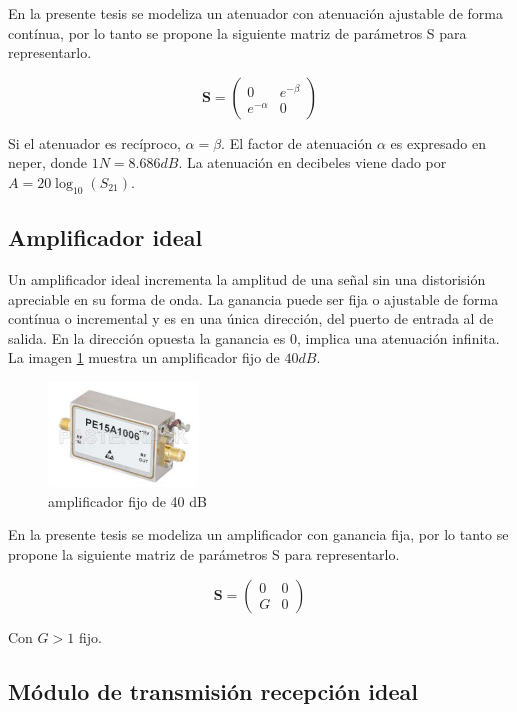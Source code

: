 En la presente tesis se modeliza un atenuador con atenuación ajustable de forma contínua, por lo tanto se propone la siguiente
matriz de parámetros S para representarlo.

$$
\mathbf{S} = \begin{pmatrix} 0 & e^{-\beta}\\e^{-\alpha} & 0\end{pmatrix}
$$

Si el atenuador es recíproco, $\alpha = \beta$. El factor de atenuación $\alpha$ es expresado en neper, donde $1N = 8.686dB$.
La atenuación en decibeles viene dado por $A = 20\log_{10}(S_{21})$. 


\subsection{Amplificador ideal}

Un amplificador ideal incrementa la amplitud de una señal sin una distorisión apreciable en su forma de onda. La ganancia puede
ser fija o ajustable de forma contínua o incremental \cite{Standard1996} y es en una única dirección, del puerto de entrada al
de salida. En la dirección opuesta la ganancia es 0, implica una atenuación infinita. La imagen \ref{fig:amplifier} muestra un
amplificador fijo de $40 dB$.

\begin{figure}[H]
 \centering
 \includegraphics[width=4cm]{gfx/amplifier.png}
 \caption{amplificador fijo de 40 dB \cite{Pasternack2014}}
 \label{fig:amplifier}
\end{figure}

En la presente tesis se modeliza un amplificador con ganancia fija, por lo tanto se propone la siguiente matriz de parámetros S
para representarlo.

$$
\mathbf{S} = \begin{pmatrix} 0 & 0\\G & 0\end{pmatrix}
$$

Con $G > 1$ fijo.


\subsection{Módulo de transmisión recepción ideal}


